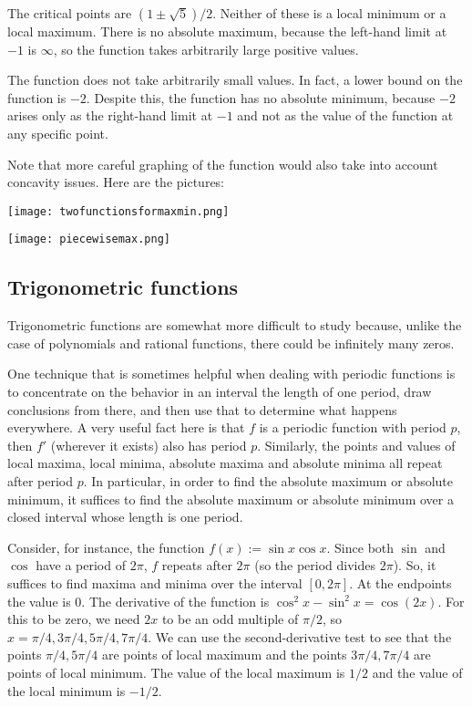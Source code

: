 \documentclass[10pt]{amsart}
\begin{document}
The critical points are $(1 \pm \sqrt{5})/2$. Neither of these is a
local minimum or a local maximum. There is no absolute maximum,
because the left-hand limit at $-1$ is $\infty$, so the function takes
arbitrarily large positive values.

The function does not take arbitrarily small values. In fact, a lower
bound on the function is $-2$. Despite this, the function has no
absolute minimum, because $-2$ arises only as the right-hand limit at
$-1$ and not as the value of the function at any specific point. 

Note that more careful graphing of the function would also take into
account concavity issues. Here are the pictures:

\texttt{[image: twofunctionsformaxmin.png]}

\texttt{[image: piecewisemax.png]}

\subsection{Trigonometric functions}

Trigonometric functions are somewhat more difficult to study because,
unlike the case of polynomials and rational functions, there could be
infinitely many zeros.

One technique that is sometimes helpful when dealing with periodic
functions is to concentrate on the behavior in an interval the length
of one period, draw conclusions from there, and then use that to
determine what happens everywhere. A very useful fact here is that $f$
is a periodic function with period $p$, then $f'$ (wherever it exists)
also has period $p$. Similarly, the points and values of local maxima,
local minima, absolute maxima and absolute minima all repeat after
period $p$. In particular, in order to find the absolute maximum or
absolute minimum, it suffices to find the absolute maximum or absolute
minimum over a closed interval whose length is one period.

Consider, for instance, the function $f(x) := \sin x \cos x$. Since
both $\sin$ and $\cos$ have a period of $2\pi$, $f$ repeats after
$2\pi$ (so the period divides $2\pi$). So, it suffices to find maxima
and minima over the interval $[0,2\pi]$. At the endpoints the value is
$0$. The derivative of the function is $\cos^2 x - \sin^2 x = \cos
(2x)$. For this to be zero, we need $2x$ to be an odd multiple of
$\pi/2$, so $x = \pi/4, 3\pi/4, 5\pi/4, 7\pi/4$. We can use the
second-derivative test to see that the points $\pi/4, 5\pi/4$ are
points of local maximum and the points $3\pi/4, 7\pi/4$ are points of
local minimum. The value of the local maximum is $1/2$ and the value
of the local minimum is $-1/2$.
\end{document}
